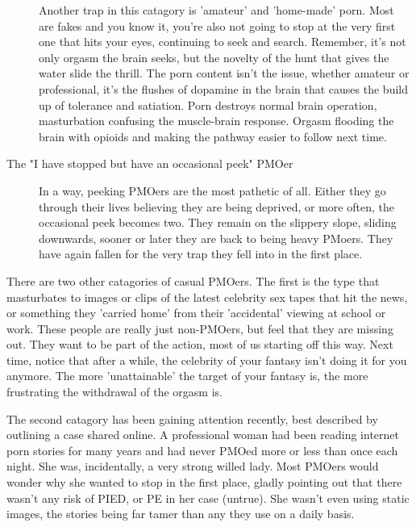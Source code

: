 \documentclass[easypeasy]{subfiles}
\begin{document}
\begin{description}
  Another trap in this catagory is 'amateur' and 'home-made' porn. Most are fakes and you know it, you're also not going to stop at the very first one that hits your eyes, continuing to seek and search. Remember, it's not only orgasm the brain seeks, but the novelty of the hunt that gives the water slide the thrill. The porn content isn't the issue, whether amateur or professional, it's the flushes of dopamine in the brain that causes the build up of tolerance and satiation. Porn destroys normal brain operation, masturbation confusing the muscle-brain response. Orgasm flooding the brain with opioids and making the pathway easier to follow next time.

\item[The "I have stopped but have an occasional peek" PMOer] In a way, peeking PMOers are the most pathetic of all. Either they go through their lives believing they are being deprived, or more often, the occasional peek becomes two. They remain on the slippery slope, sliding downwards, sooner or later they are back to being heavy PMoers. They have again fallen for the very trap they fell into in the first place.

 \end{description}

There are two other catagories of casual PMOers. The first is the type that masturbates to images or clips of the latest celebrity sex tapes that hit the news, or something they 'carried home' from their 'accidental' viewing at school or work. These people are really just non-PMOers, but feel that they are missing out. They want to be part of the action, most of us starting off this way. Next time, notice that after a while, the celebrity of your fantasy isn't doing it for you anymore. The more 'unattainable' the target of your fantasy is, the more frustrating the withdrawal of the orgasm is.

The second catagory has been gaining attention recently, best described by outlining a case shared online. A professional woman had been reading internet porn stories for many years and had never PMOed more or less than once each night. She was, incidentally, a very strong willed lady. Most PMOers would wonder why she wanted to stop in the first place, gladly pointing out that there wasn't any risk of PIED, or PE in her case (untrue). She wasn't even using static images, the stories being far tamer than any they use on a daily basis.
\end{document}
